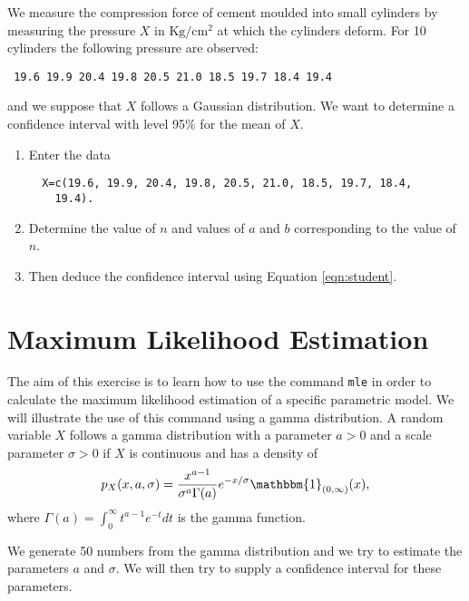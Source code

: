 \documentclass[a4paper,10pt]{article}
\begin{document}
We measure the compression force of cement moulded into small cylinders by measuring the pressure $X$ in $\mbox{Kg}/\mbox{cm}^2$ at which the cylinders deform. For 10 cylinders the following pressure are observed: 
\begin{lstlisting}
 19.6 19.9 20.4 19.8 20.5 21.0 18.5 19.7 18.4 19.4
\end{lstlisting}
and we suppose that $X$ follows a Gaussian distribution. We want to determine a confidence interval with level 95\% for the mean of $X$. 
\begin{enumerate}
 \item Enter the data 
 \begin{lstlisting} 
  X=c(19.6, 19.9, 20.4, 19.8, 20.5, 21.0, 18.5, 19.7, 18.4, 
    19.4).
 \end{lstlisting}
\item Determine the value of $n$ and values of $a$ and $b$ corresponding to the value of $n$. 
\item Then deduce the confidence interval using Equation \ref{eqn:student}. 
\end{enumerate}

\section{Maximum Likelihood Estimation} 

The aim of this exercise is to learn how to use the command \texttt{mle} in order to calculate the maximum likelihood estimation of a specific parametric model. We will illustrate the use of this command using a gamma distribution. A random variable $X$ follows a gamma distribution with a parameter $a > 0$ and a scale parameter $\sigma > 0$ if $X$ is continuous and has a density of 
\begin{equation} 
 p_X(x, a, \sigma) = \frac{x^{a-1}}{\sigma^a\Gamma(a)} e^{-x/\sigma}  \mathbbm{1}_{(0, \infty)}(x), 
\end{equation}
where $\Gamma(a) = \int_0^\infty t^{a-1}e^{-t} dt$ is the gamma function. 

We generate 50 numbers from the gamma distribution and we try to estimate the parameters $a$ and $\sigma$. We will then try to supply a confidence interval for these parameters. 
\end{document}
